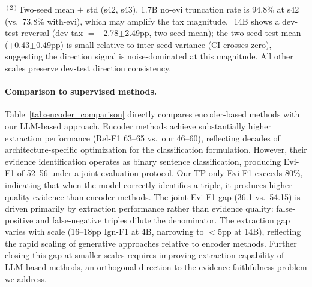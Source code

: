 \begin{table}[t]
\centering
\caption{RSFT inference-time evidence tax on Re-DocRED test set (Ign-F1 \%). Tax $=$ no-evi $-$ with-evi; positive $=$ cost. Per-seed s42 except where noted.}
\label{tab:rsft_test_tax}
\small
{}
\vspace{-2mm}
{\raggedright\footnotesize $^{(2)}$Two-seed mean $\pm$ std (s42, s43). 1.7B no-evi truncation rate is 94.8\% at s42 (vs.\ 73.8\% with-evi), which may amplify the tax magnitude. $^\dagger$14B shows a dev-test reversal (dev tax $= -$2.78$\pm$2.49pp, two-seed mean); the two-seed test mean (+0.43$\pm$0.49pp) is small relative to inter-seed variance (CI crosses zero), suggesting the direction signal is noise-dominated at this magnitude. All other scales preserve dev-test direction consistency.\par}
\end{table}

\paragraph{Comparison to supervised methods.}
Table~\ref{tab:encoder_comparison} directly compares encoder-based methods with our LLM-based approach. Encoder methods achieve substantially higher extraction performance (Rel-F1 63--65 vs.\ our 46--60), reflecting decades of architecture-specific optimization for the classification formulation. However, their evidence identification operates as binary sentence classification, producing Evi-F1 of 52--56 under a joint evaluation protocol. Our TP-only Evi-F1 exceeds 80\%, indicating that when the model correctly identifies a triple, it produces higher-quality evidence than encoder methods. The joint Evi-F1 gap (36.1 vs.\ 54.15) is driven primarily by extraction performance rather than evidence quality: false-positive and false-negative triples dilute the denominator. The extraction gap varies with scale (16--18pp Ign-F1 at 4B, narrowing to $<$5pp at 14B), reflecting the rapid scaling of generative approaches relative to encoder methods. Further closing this gap at smaller scales requires improving extraction capability of LLM-based methods, an orthogonal direction to the evidence faithfulness problem we address.

